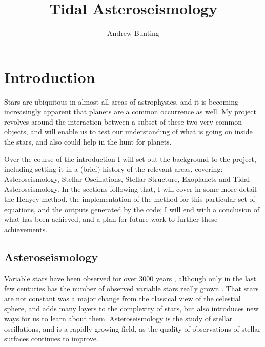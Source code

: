 \documentclass[11pt]{amsart}
\title{Tidal Asteroseismology}
\author{Andrew Bunting}
\begin{document}
\maketitle

\section{Introduction}

Stars are ubiquitous in almost all areas of astrophysics, and it is becoming increasingly apparent that planets are a common occurrence as well.  My project revolves around the interaction between a subset of these two very common objects, and will enable us to test our understanding of what is going on inside the stars, and also could help in the hunt for planets.

Over the course of the introduction I will set out the background to the project, including setting it in a (brief) history of the relevant areas, covering: Asteroseismology, Stellar Oscillations, Stellar Structure, Exoplanets and Tidal Asteroseismology.  In the sections following that, I will cover in some more detail the Henyey method, the implementation of the method for this particular set of equations, and the outputs generated by the code; I will end with a conclusion of what has been achieved, and a plan for future work to further these achievements.







\subsection{Asteroseismology}

Variable stars have been observed for over $3000$ years \cite{Jetsu2015}, although only in the last few centuries has the number of observed variable stars really grown \cite{Hoffleit1997}.  That stars are not constant was a major change from the classical view of the celestial sphere, and adds many layers to the complexity of stars, but also introduces new ways for us to learn about them.  Asteroseismology is the study of stellar oscillations, and is a rapidly growing field, as the quality of observations of stellar surfaces continues to improve.
\end{document}
